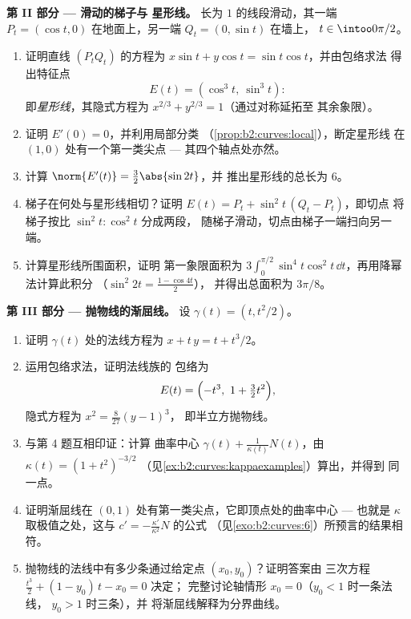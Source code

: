 \begin{problem}
\medskip
\noindent\textbf{第 II 部分 --- 滑动的梯子与
星形线。} 长为 $1$ 的线段滑动，其一端 $P_t =
(\cos t, 0)$ 在地面上，另一端 $Q_t = (0, \sin t)$ 在墙上，
$t \in \intoo0{\pi/2}$。
\begin{enumerate}[resume]
  \item 证明直线 $(P_tQ_t)$ 的方程为 $x\sin t +
        y\cos t = \sin t\cos t$，并由包络求法
        得出特征点
        \[
        E(t) = (\cos^3 t,\ \sin^3 t) :
        \]
        即\emph{星形线}，其隐式方程为
        $x^{2/3} + y^{2/3} = 1$（通过对称延拓至
        其余象限）。
  \item 证明 $E'(0) = 0$，并利用局部分类
        （\cref{prop:b2:curves:local}），断定星形线
        在 $(1, 0)$ 处有一个第一类尖点
        --- 其四个轴点处亦然。
  \item 计算 $\norm{E'(t)} = \tfrac32\abs{\sin 2t}$，并
        推出星形线的总长为 $6$。
  \item 梯子在何处与星形线相切？证明 $E(t) =
        P_t + \sin^2 t\,(Q_t - P_t)$，即切点
        将梯子按比 $\sin^2 t : \cos^2
        t$ 分成两段，
        随梯子滑动，切点由梯子一端扫向另一端。
  \item 计算星形线所围面积，证明
        第一象限面积为 $3\int_0^{\pi/2}\sin^4
        t\cos^2 t\,\dd t$，再用降幂法计算此积分
        （$\sin^2 2t = \tfrac{1 - \cos 4t}2$），
        并得出总面积为 $3\pi/8$。
\end{enumerate}

\medskip
\noindent\textbf{第 III 部分 --- 抛物线的渐屈线。}
设 $\gamma(t) = (t, t^2/2)$。
\begin{enumerate}[resume]
  \item 证明 $\gamma(t)$ 处的法线方程为
        $x + t\,y = t + t^3/2$。
  \item 运用包络求法，证明法线族的
        包络为
        \[
        E(t) = \Bigl(-t^3,\ 1 + \tfrac32 t^2\Bigr),
        \]
        隐式方程为 $x^2 = \tfrac8{27}(y - 1)^3$，
        即半立方抛物线。
  \item 与第 4 题互相印证：计算
        曲率中心 $\gamma(t) + \frac1{\kappa(t)}N(t)$，由
        $\kappa(t) = (1 + t^2)^{-3/2}$
        （见\cref{ex:b2:curves:kappaexamples}）算出，并得到
        同一点。
  \item 证明渐屈线在
        $(0, 1)$ 处有第一类尖点，它即顶点处的曲率中心
        --- 也就是 $\kappa$ 取极值之处，这与
        $c' = -\frac{\kappa'}{\kappa^2}N$ 的公式
        （见\cref{exo:b2:curves:6}）所预言的结果相符。
  \item 抛物线的法线中有多少条通过给定点
        $(x_0, y_0)$？证明答案由
        三次方程 $\tfrac{t^3}2 + (1 - y_0)\,t - x_0 = 0$ 决定；
        完整讨论轴情形 $x_0 = 0$（$y_0 < 1$ 时一条法线，
        $y_0 > 1$ 时三条），并
        将渐屈线解释为分界曲线。
\end{enumerate}


\end{problem}
